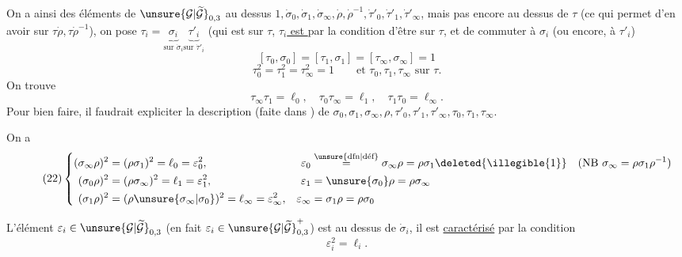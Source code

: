 On a ainsi des éléments de $\unsure{\mathcal G|\widetilde{\mathcal G}}_{0,3}$ au dessus 
$1,\dot\sigma_0,\dot\sigma_1,\dot\sigma_\infty,\dot\rho,\dot\rho^{-1},\dot\tau'_0,\dot\tau'_1,\dot\tau'_\infty$,
mais pas encore au dessus de $\tau$ (ce qui permet d'en avoir sur $\tau\dot\rho,\tau\dot\rho^{-1}$),
on pose
$\tau_i=\underbrace{\sigma_i}_{\text{sur }\dot\sigma_i}\underbrace{\tau'_i}_{\text{sur }\dot\tau'_i}$
(qui est sur $\tau$, 
\uline{$\tau_i$ est } 
par la condition d'être sur $\tau$,  et de commuter à $\sigma_i$ (ou encore, à $\tau'_i$)
\[
\tag{19}
[\tau_0,\sigma_0]=[\tau_1,\sigma_1]=[\tau_\infty,\sigma_\infty]=1
\]
\[
\tag{20}
\tau_0^2=\tau_1^2=\tau_\infty^2=1
\qquad\text{et }\tau_0,\tau_1,\tau_\infty\text{ sur }\tau.
\]
On trouve
\[
\tag{21}
\tau_\infty\tau_1=\ell_0,\quad\tau_0\tau_\infty=\ell_1,\quad\tau_1\tau_0=\ell_\infty.
\]
Pour bien faire, il faudrait expliciter la description  (faite dans \unsure{[C]|[TC]}) de
$\sigma_0,\sigma_1,\sigma_\infty,\rho,\tau'_0,\tau'_1,\tau'_\infty,\tau_0,\tau_1,\tau_\infty$.



On a
\[
\tag{22}
\left\{\begin{aligned}
(\sigma_\infty\rho)^2&=(\rho\sigma_1)^2=\ell_0=\varepsilon_0^2,&
\varepsilon_0&\overset{\unsure{\text{dfn}|\text{déf}}}{=}\sigma_\infty\rho=\rho\sigma_1\deleted{\illegible{1}}
\quad(\mathrm{NB}\ \sigma_\infty=\rho\sigma_1\rho^{-1})\\
(\sigma_0\rho)^2&=(\rho\sigma_\infty)^2=\ell_1=\varepsilon_1^2,&
\varepsilon_1&=\unsure{\sigma_0}\rho=\rho\sigma_\infty\\
(\sigma_1\rho)^2&=(\rho\unsure{\sigma_\infty|\sigma_0})^2=\ell_\infty=\varepsilon_\infty^2,&
\varepsilon_\infty&=\sigma_1\rho=\rho\sigma_0
\end{aligned}\right.
\]

L'élément $\varepsilon_i\in\unsure{\mathcal G|\widetilde{\mathcal G}}_{0,3}$
(en fait $\varepsilon_i\in\unsure{\mathcal G|\widetilde{\mathcal G}}_{0,3}^{+}$) est au dessus de $\dot\sigma_i$,
il est \uline{caractérisé} par la condition
\[
\varepsilon_i^2=\ell_i.
\]

